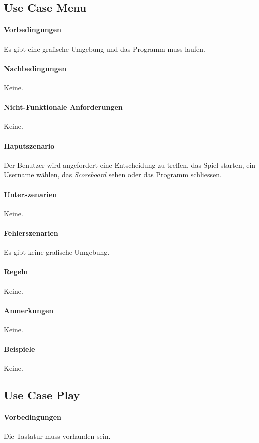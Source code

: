 \documentclass[a4paper, twosided, 11pt]{scrartcl}
\begin{document}
\subsection{Use Case Menu}
\paragraph{Vorbedingungen} Es gibt eine grafische Umgebung und das Programm
muss laufen.
\paragraph{Nachbedingungen} Keine.
\paragraph{Nicht-Funktionale Anforderungen} Keine.
\paragraph{Haputszenario} Der Benutzer wird angefordert eine Entscheidung zu
treffen, das Spiel starten, ein Username w\"ahlen, das \emph{Scoreboard} sehen
oder das Programm schliessen.
\paragraph{Unterszenarien} Keine.
\paragraph{Fehlerszenarien} Es gibt keine grafische Umgebung.
\paragraph{Regeln} Keine.
\paragraph{Anmerkungen} Keine.
\paragraph{Beispiele} Keine.

\subsection{Use Case Play}
\paragraph{Vorbedingungen} Die Tastatur muss vorhanden sein.
\end{document}
